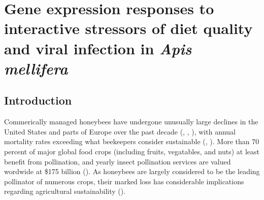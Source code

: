 \documentclass[11pt,a4paper,oldfontcommands,openany]{memoir}
\numberwithin{equation}{section} %
\begin{document}
\sloppy


% 
% 
% 
% 
% 
% 
% 
% 
% 
% 
% 
% 
% 
% 
% 
% 
% 
% 
% 
% 
% 

\setsecheadstyle{\Large\bfseries\sffamily\raggedright}
\setsubsecheadstyle{\large\bfseries\sffamily\raggedright}
\setsubsubsecheadstyle{\bfseries\sffamily\raggedright}


\setlength{\parskip}{10pt} %

\OnehalfSpacing

\chapter{Gene expression responses to interactive stressors of diet quality and viral infection in \textit{Apis mellifera}}

\section{Introduction}

Commerically managed honeybees have undergone unusually large declines in the United States and parts of Europe over the past decade (\citealt{ccd1}, \citealt{ccd2}, \citealt{ccd3}), with annual mortality rates exceeding what beekeepers consider sustainable (\citealt{ccd5}, \citealt{ccd6}). More than 70 percent of major global food crops (including fruits, vegatables, and nuts) at least benefit from pollination, and yearly insect pollination services are valued wordwide at \$175 billion (\citealt{ccd7}). As honeybees are largely considered to be the leading pollinator of numerous crops, their marked loss has considerable implications regarding agricultural sustainability (\citealt{ccd4}).
\end{document}
